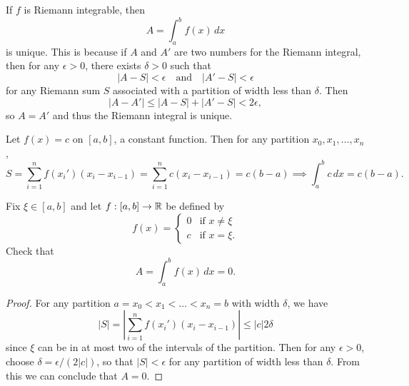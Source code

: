 \begin{remark}
  If $f$ is Riemann integrable, then
  \[
    A = \int_a^b f(x)\, dx
  \]
  is unique. This is because if $A$ and $A'$ are two
  numbers for the Riemann integral, then for any
  $\epsilon > 0$, there exists $\delta > 0$ such that
  \[
    |A - S| < \epsilon \quad \text{and} \quad
    |A' - S| < \epsilon
  \]
  for any Riemann sum $S$ associated with a partition of
  width less than $\delta$. Then
  \[
    |A - A'| \le |A - S| + |A' - S| < 2\epsilon,
  \]
  so $A = A'$ and thus the Riemann integral is unique.
\end{remark}

\begin{example}
  Let $f(x) = c$ on $[a, b]$, a constant function. Then for any partition $x_0, x_1, \dots, x_n$,
  \[
    S = \sum_{i = 1}^n f(x_i') (x_i - x_{i - 1}) =
    \sum_{i = 1}^n c (x_i - x_{i - 1}) = c(b - a)
    \implies \int_a^b c\, dx = c(b - a).
  \]
\end{example}

\begin{example}
  Fix $\xi \in [a, b]$ and let $f : [a, b] \to \mathbb{R}$
  be defined by
  \[
    f(x) = \begin{cases}
      0 & \text{if } x \ne \xi \\
      c & \text{if } x = \xi.
    \end{cases}
  \]
  Check that
  \[
    A = \int_a^b f(x)\, dx = 0.
  \]
\end{example}

\begin{proof}
  For any partition $a = x_0 < x_1 < \dots < x_n = b$
  with width $\delta$, we have
  \[
    |S| = \left|\sum_{i = 1}^n f(x_i') (x_i - x_{i - 1})\right|
    \le |c| 2\delta
  \]
  since $\xi$ can be in at most two of the intervals of
  the partition. Then for any $\epsilon > 0$,
  choose $\delta = \epsilon / (2|c|)$, so that
  $|S| < \epsilon$ for any partition of width less
  than $\delta$. From this we can conclude that $A = 0$.
\end{proof}

